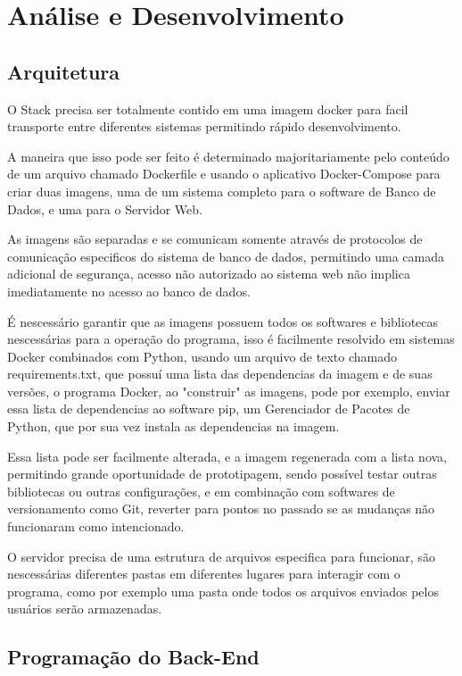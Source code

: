 \chapter{Análise e Desenvolvimento}

\section{Arquitetura}

O Stack precisa ser totalmente contido em uma imagem docker para facil transporte entre diferentes sistemas permitindo rápido desenvolvimento.

A maneira que isso pode ser feito é determinado majoritariamente pelo conteúdo de um arquivo chamado Dockerfile e usando o aplicativo Docker-Compose para criar duas imagens, uma de um sistema completo para o software de Banco de Dados, e uma para o Servidor Web.

As imagens são separadas e se comunicam somente através de protocolos de comunicação especificos do sistema de banco de dados, permitindo uma camada adicional de segurança, acesso não autorizado ao sistema web não implica imediatamente no acesso ao banco de dados.

É nescessário garantir que as imagens possuem todos os softwares e bibliotecas nescessárias para a operação do programa, isso é facilmente resolvido em sistemas Docker combinados com Python, usando um arquivo de texto chamado requirements.txt, que possuí uma lista das dependencias da imagem e de suas versões, o programa Docker, ao "construir" as imagens, pode por exemplo, enviar essa lista de dependencias ao software pip, um Gerenciador de Pacotes de Python, que por sua vez instala as dependencias na imagem.

Essa lista pode ser facilmente alterada, e a imagem regenerada com a lista nova, permitindo grande oportunidade de prototipagem, sendo possível testar outras bibliotecas ou outras configurações, e em combinação com softwares de versionamento como Git, reverter para pontos no passado se as mudanças não funcionaram como intencionado.

O servidor precisa de uma estrutura de arquivos especifica para funcionar, são nescessárias diferentes pastas em diferentes lugares para interagir com o programa, como por exemplo uma pasta onde todos os arquivos enviados pelos usuários serão armazenadas.

\section{Programação do Back-End}

